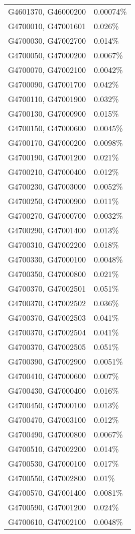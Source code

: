 \begin{longtable}[]{@{}ll@{}}
G4601370, G46000200 & 0.00074\% \\
G4700010, G47001601 & 0.026\% \\
G4700030, G47002700 & 0.014\% \\
G4700050, G47000200 & 0.0067\% \\
G4700070, G47002100 & 0.0042\% \\
G4700090, G47001700 & 0.042\% \\
G4700110, G47001900 & 0.032\% \\
G4700130, G47000900 & 0.015\% \\
G4700150, G47000600 & 0.0045\% \\
G4700170, G47000200 & 0.0098\% \\
G4700190, G47001200 & 0.021\% \\
G4700210, G47000400 & 0.012\% \\
G4700230, G47003000 & 0.0052\% \\
G4700250, G47000900 & 0.011\% \\
G4700270, G47000700 & 0.0032\% \\
G4700290, G47001400 & 0.013\% \\
G4700310, G47002200 & 0.018\% \\
G4700330, G47000100 & 0.0048\% \\
G4700350, G47000800 & 0.021\% \\
G4700370, G47002501 & 0.051\% \\
G4700370, G47002502 & 0.036\% \\
G4700370, G47002503 & 0.041\% \\
G4700370, G47002504 & 0.041\% \\
G4700370, G47002505 & 0.051\% \\
G4700390, G47002900 & 0.0051\% \\
G4700410, G47000600 & 0.007\% \\
G4700430, G47000400 & 0.016\% \\
G4700450, G47000100 & 0.013\% \\
G4700470, G47003100 & 0.012\% \\
G4700490, G47000800 & 0.0067\% \\
G4700510, G47002200 & 0.014\% \\
G4700530, G47000100 & 0.017\% \\
G4700550, G47002800 & 0.01\% \\
G4700570, G47001400 & 0.0081\% \\
G4700590, G47001200 & 0.024\% \\
G4700610, G47002100 & 0.0048\% \\

\end{longtable}
